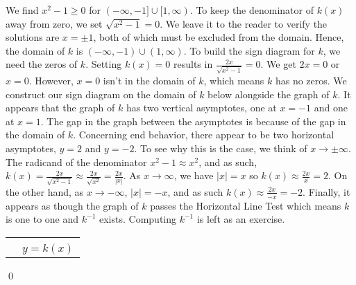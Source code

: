 \documentclass[12pt]{ximera}
\begin{document}
\begin{example}
\begin{enumerate}
We find $x^2 - 1 \geq 0$ for $(-\infty, -1] \cup [1, \infty)$.  To keep the denominator of $k(x)$ away from zero, we set $\sqrt{x^2-1} = 0$. We leave it to the reader to verify the solutions are $x = \pm 1$, both of which must be excluded from the domain.    Hence, the domain of $k$ is $(-\infty, -1) \cup (1,\infty)$.  To build the sign diagram for $k$, we need the zeros of $k$.  Setting $k(x) = 0$ results in $\frac{2x}{\sqrt{x^2 - 1}}= 0$.  We get $2x =0$ or $x=0$.  However, $x=0$ isn't in the domain of $k$, which means $k$ has no zeros.  We construct our sign diagram on the domain of $k$ below alongside the graph of $k$. It appears that the graph of $k$ has two vertical asymptotes, one at $x=-1$ and one at $x=1$.   The gap in the graph between the asymptotes is because of the gap in the domain of $k$. Concerning end behavior, there appear to be two horizontal asymptotes, $y = 2$ and $y=-2$.  To see why this is the case, we think of $x\rightarrow \pm \infty$.   The radicand of the denominator $x^2 - 1 \approx x^2$, and as such, $k(x) = \frac{2x}{\sqrt{x^2 - 1}} \approx \frac{2x}{\sqrt{x^2}} = \frac{2x}{|x|}$.  As $x \rightarrow \infty$, we have $|x| = x$ so $k(x) \approx \frac{2x}{x} = 2$.  On the other hand, as $x \rightarrow -\infty$, $|x| = -x$, and as such $k(x) \approx \frac{2x}{-x} = -2$. Finally, it appears as though the graph of $k$ passes the Horizontal Line Test which means $k$ is one to one and $k^{-1}$ exists.  Computing $k^{-1}$ is left as an exercise.

\begin{tabular}{m{2.5in}c}













&

 \\ 

& $y = k(x)$ \\

\end{tabular}

\qed
\end{enumerate}

\end{example}
\end{document}
